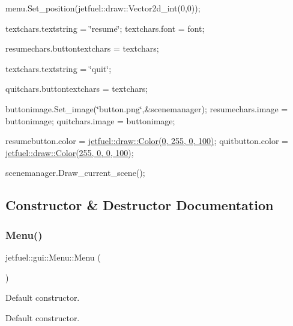 menu.\+Set\+\_\+position(jetfuel\+::draw\+::\+Vector2d\+\_\+int(0,0));

textchars.\+textstring = \char`\"{}resume\char`\"{}; textchars.\+font = font;

resumechars.\+buttontextchars = textchars;

textchars.\+textstring = \char`\"{}quit\char`\"{};

quitchars.\+buttontextchars = textchars;

buttonimage.\+Set\+\_\+image(\char`\"{}button.\+png\char`\"{},\&scenemanager); resumechars.\+image = buttonimage; quitchars.\+image = buttonimage;

resumebutton.\+color = \hyperlink{classjetfuel_1_1draw_1_1Color}{jetfuel\+::draw\+::\+Color(0, 255, 0, 100)}; quitbutton.\+color = \hyperlink{classjetfuel_1_1draw_1_1Color}{jetfuel\+::draw\+::\+Color(255, 0, 0, 100)};

scenemanager.\+Draw\+\_\+current\+\_\+scene(); 

\subsection{Constructor \& Destructor Documentation}
\mbox{\label{classjetfuel_1_1gui_1_1Menu_a8cdd5967a5c57fd28924ac5f9c979398}} 
\subsubsection{\texorpdfstring{Menu()}{Menu()}\hspace{0.1cm}{\footnotesize\ttfamily [1/2]}}
{\footnotesize\ttfamily jetfuel\+::gui\+::\+Menu\+::\+Menu (\begin{DoxyParamCaption}{ }\end{DoxyParamCaption})\hspace{0.3cm}{\ttfamily [inline]}}



Default constructor. 

Default constructor. \mbox{\label{classjetfuel_1_1gui_1_1Menu_ae09bc951a919594033f94c5d827889d1}} 
